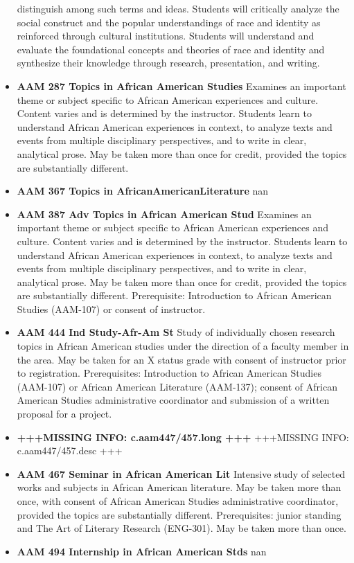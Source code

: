 \documentclass[
  letterpaper,
]{scrbook}
\begin{document}
\begin{itemize}
  distinguish among such terms and ideas. Students will critically
  analyze the social construct and the popular understandings of race
  and identity as reinforced through cultural institutions. Students
  will understand and evaluate the foundational concepts and theories of
  race and identity and synthesize their knowledge through research,
  presentation, and writing.
\item
  \textbf{AAM 287 Topics in African American Studies} Examines an
  important theme or subject specific to African American experiences
  and culture. Content varies and is determined by the instructor.
  Students learn to understand African American experiences in context,
  to analyze texts and events from multiple disciplinary perspectives,
  and to write in clear, analytical prose. May be taken more than once
  for credit, provided the topics are substantially different.
\item
  \textbf{AAM 367 Topics in AfricanAmericanLiterature} nan
\item
  \textbf{AAM 387 Adv Topics in African American Stud} Examines an
  important theme or subject specific to African American experiences
  and culture. Content varies and is determined by the instructor.
  Students learn to understand African American experiences in context,
  to analyze texts and events from multiple disciplinary perspectives,
  and to write in clear, analytical prose. May be taken more than once
  for credit, provided the topics are substantially different.
  Prerequisite: Introduction to African American Studies (AAM-107) or
  consent of instructor.
\item
  \textbf{AAM 444 Ind Study-Afr-Am St} Study of individually chosen
  research topics in African American studies under the direction of a
  faculty member in the area. May be taken for an X status grade with
  consent of instructor prior to registration. Prerequisites:
  Introduction to African American Studies (AAM-107) or African American
  Literature (AAM-137); consent of African American Studies
  administrative coordinator and submission of a written proposal for a
  project.
\item
  \textbf{+++MISSING INFO: c.aam447/457.long +++} +++MISSING INFO:
  c.aam447/457.desc +++
\item
  \textbf{AAM 467 Seminar in African American Lit} Intensive study of
  selected works and subjects in African American literature. May be
  taken more than once, with consent of African American Studies
  administrative coordinator, provided the topics are substantially
  different. Prerequisites: junior standing and The Art of Literary
  Research (ENG-301). May be taken more than once.
\item
  \textbf{AAM 494 Internship in African American Stds} nan
\end{itemize}
\end{document}
